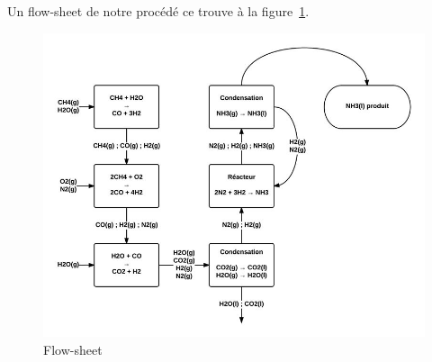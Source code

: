 Un flow-sheet de notre procédé ce trouve à la figure~\ref{Flowsheet}.
\begin{figure}
  \begin{center}
 	 \includegraphics[scale=0.4]{Shema1.jpg}
  	 \caption{Flow-sheet}
  	 \label{Flowsheet}
  \end{center}
\end{figure}


%
